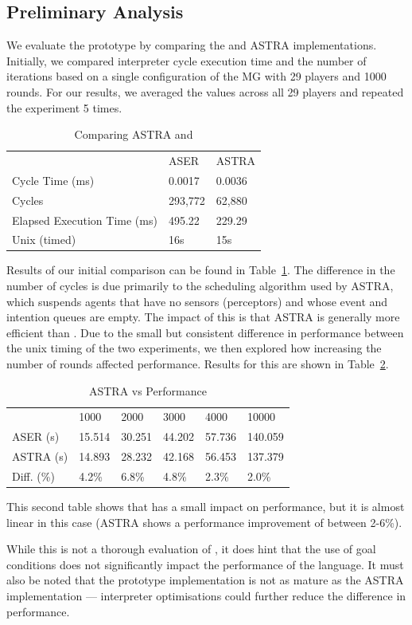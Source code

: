 \subsection{Preliminary Analysis}
\label{performance}

We evaluate the prototype by comparing the {\aser} and ASTRA implementations. Initially,
we compared interpreter cycle execution time and the number of iterations based on a
single configuration of the MG with 29 players and 1000 rounds. For our results, we averaged
the values across all 29 players and repeated the experiment 5 times.

\begin{table}[]
\centering
\caption{Comparing ASTRA and {\aser}}
\label{comparison}
\begin{tabular}{lll}
                            & ASER    & ASTRA  \\
Cycle Time (ms)             & 0.0017  & 0.0036 \\
Cycles                      & 293,772 & 62,880 \\
Elapsed Execution Time (ms) & 495.22  & 229.29 \\
Unix (timed)                & 16s     & 15s   
\end{tabular}
\end{table}

Results of our initial comparison can be found in Table~\ref{comparison}. The difference
in the number of cycles is due primarily to the scheduling algorithm used by ASTRA, which
suspends agents that have no sensors (perceptors) and whose event and intention queues are empty.
The impact of this is that ASTRA is generally more efficient than {\aser}. Due to the small but 
consistent difference in performance between the unix timing of the two experiments, we then 
explored how increasing the number of rounds affected performance. Results for this are shown 
in Table~\ref{rounds}.

\begin{table}[]
\centering
\caption{ASTRA vs {\aser} Performance}
\label{rounds}
\begin{tabular}{llllll}
           & 1000   & 2000   & 3000   & 4000   & 10000   \\
ASER (s)   & 15.514 & 30.251 & 44.202 & 57.736 & 140.059 \\
ASTRA (s)  & 14.893 & 28.232 & 42.168 & 56.453 & 137.379 \\
Diff. (\%) & 4.2\%  & 6.8\%  & 4.8\%  & 2.3\%  & 2.0\%  
\end{tabular}
\end{table}

This second table shows that {\aser} has a small impact on performance, but it is 
almost linear in this case (ASTRA shows a performance improvement of between 2-6\%).

While this is not a thorough evaluation of {\aser}, it does hint that the use of
goal conditions does not significantly impact the performance of the language. It 
must also be noted that the prototype implementation is not as mature as the ASTRA
implementation --- interpreter optimisations could further reduce the difference 
in performance.

